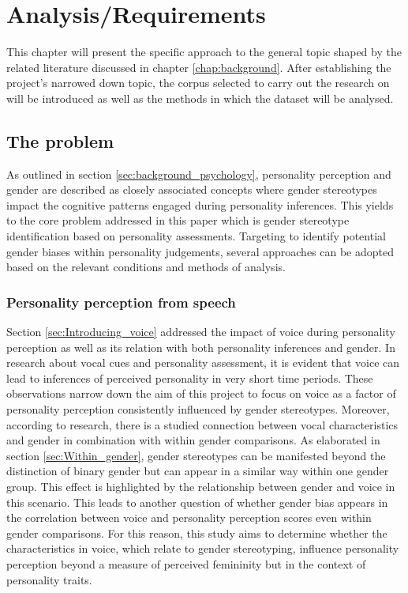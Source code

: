 \documentclass{l4proj}
\begin{document}
\chapter{Analysis/Requirements}\label{chap:Analysis}

This chapter will present the specific approach to the general topic shaped by the related literature discussed in chapter \ref{chap:background}. After establishing the project's narrowed down topic, the corpus selected to carry out the research on will be introduced as well as the methods in which the dataset will be analysed.

\section{The problem}
As outlined in section \ref{sec:background_psychology}, personality perception and gender are described as closely associated concepts where gender stereotypes impact the cognitive patterns engaged during personality inferences. This yields to the core problem addressed in this paper which is gender stereotype identification based on personality assessments. Targeting to identify potential gender biases within personality judgements, several approaches can be adopted based on the relevant conditions and methods of analysis.

\subsection{Personality perception from speech}
Section \ref{sec:Introducing_voice} addressed the impact of voice during personality perception as well as its relation with both personality inferences and gender. In research about vocal cues and personality assessment, it is evident that voice can lead to inferences of perceived personality in very short time periods. These observations narrow down the aim of this project to focus on voice as a factor of personality perception consistently influenced by gender stereotypes. 
Moreover, according to research, there is a studied connection between vocal characteristics and gender in combination with within gender comparisons. As elaborated in section \ref{sec:Within_gender}, gender stereotypes can be manifested beyond the distinction of binary gender but can appear in a similar way within one gender group. This effect is highlighted by the relationship between gender and voice in this scenario.
This leads to another question of whether gender bias appears in the correlation between voice and personality perception scores even within gender comparisons. For this reason, this study aims to determine whether the characteristics in voice, which relate to gender stereotyping, influence personality perception beyond a measure of perceived femininity \citep{Ko2006} but in the context of personality traits.
\end{document}
